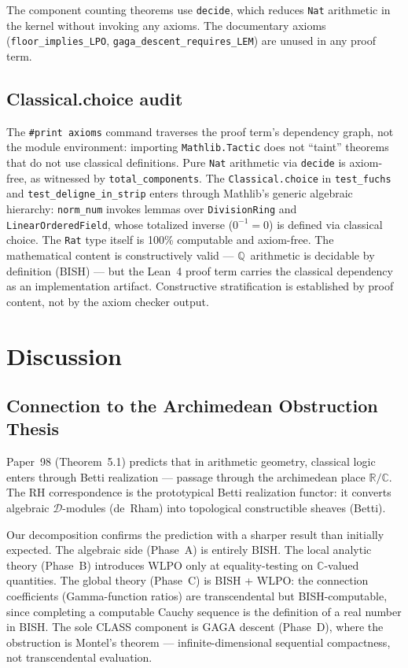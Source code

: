 \documentclass[11pt,a4paper]{article}
\theoremstyle{plain}
\theoremstyle{definition}
\newcommand{\BISH}{\textsf{BISH}}
\newcommand{\WLPO}{\textsf{WLPO}}
\newcommand{\CLASS}{\textsf{CLASS}}
\newcommand{\Q}{\mathbb{Q}}
\newcommand{\R}{\mathbb{R}}
\newcommand{\C}{\mathbb{C}}
\begin{document}
The component counting theorems use \texttt{decide}, which reduces \texttt{Nat} arithmetic in the kernel without invoking any axioms.
The documentary axioms (\texttt{floor\_implies\_LPO}, \texttt{gaga\_descent\_requires\_LEM}) are unused in any proof term.

\subsection{Classical.choice audit}

The \texttt{\#print axioms} command traverses the proof term's dependency graph, not the module environment: importing \texttt{Mathlib.Tactic} does not ``taint'' theorems that do not use classical definitions.
Pure \texttt{Nat} arithmetic via \texttt{decide} is axiom-free, as witnessed by \texttt{total\_components}.
The \texttt{Classical.choice} in \texttt{test\_fuchs} and \texttt{test\_deligne\_in\_strip} enters through Mathlib's generic algebraic hierarchy: \texttt{norm\_num} invokes lemmas over \texttt{DivisionRing} and \texttt{LinearOrderedField}, whose totalized inverse ($0^{-1} = 0$) is defined via classical choice.
The \texttt{Rat} type itself is 100\% computable and axiom-free.
The mathematical content is constructively valid --- $\Q$~arithmetic is decidable by definition (\BISH) --- but the Lean~4 proof term carries the classical dependency as an implementation artifact.
Constructive stratification is established by proof content, not by the axiom checker output.

\section{Discussion}

\subsection{Connection to the Archimedean Obstruction Thesis}

Paper~98 (Theorem~5.1) predicts that in arithmetic geometry, classical logic enters through Betti realization --- passage through the archimedean place $\R/\C$.
The RH correspondence is the prototypical Betti realization functor: it converts algebraic $\mathcal{D}$-modules (de~Rham) into topological constructible sheaves (Betti).

Our decomposition confirms the prediction with a sharper result than initially expected.
The algebraic side (Phase~A) is entirely \BISH.
The local analytic theory (Phase~B) introduces \WLPO{} only at equality-testing on $\C$-valued quantities.
The global theory (Phase~C) is \BISH{} + \WLPO{}: the connection coefficients (Gamma-function ratios) are transcendental but \BISH-computable, since completing a computable Cauchy sequence is the definition of a real number in \BISH.
The sole \CLASS{} component is GAGA descent (Phase~D), where the obstruction is Montel's theorem --- infinite-dimensional sequential compactness, not transcendental evaluation.
\end{document}

